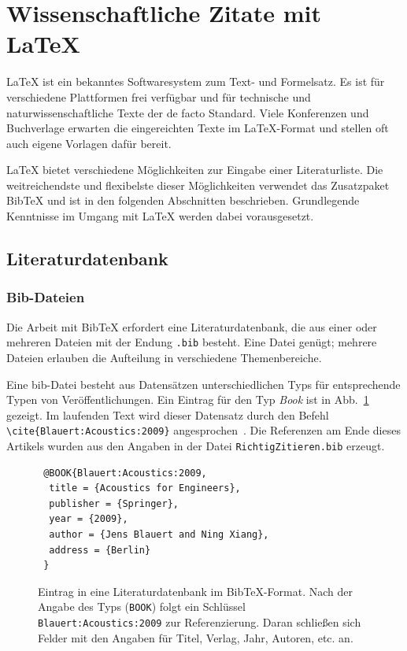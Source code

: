 \documentclass[a4paper, 10pt]{article}
\begin{document}
\section{Wissenschaftliche Zitate mit \LaTeX}
\label{sec:LaTeX}

\LaTeX{} ist ein bekanntes Softwaresystem zum Text- und Formelsatz. Es ist
f\"ur verschiedene Plattformen frei verf\"ugbar und f\"ur technische und
naturwissenschaftliche Texte der de facto Standard. Viele Konferenzen und
Buchverlage erwarten die eingereichten Texte im \LaTeX-Format und stellen oft
auch eigene Vorlagen daf\"ur bereit. 

\LaTeX{} bietet verschiedene M\"oglichkeiten zur Eingabe einer Literaturliste.
Die weitreichendste und flexibelste dieser M\"oglichkeiten verwendet das
Zusatzpaket BibTeX und ist in den folgenden Abschnitten beschrieben.
Grundlegende Kenntnisse im Umgang mit \LaTeX{} werden dabei vorausgesetzt. 

\subsection{Literaturdatenbank}

\subsubsection{Bib-Dateien}

Die Arbeit mit BibTeX erfordert eine Literaturdatenbank, die aus einer oder
mehreren Dateien mit der Endung {\tt .bib} besteht. Eine Datei gen\"ugt;
mehrere Dateien erlauben die Aufteilung in verschiedene Themenbereiche.

Eine bib-Datei besteht aus Datens\"atzen unterschiedlichen Typs f\"ur
entsprechende Typen von Ver\"offentlichungen. Ein Eintrag f\"ur den Typ
\emph{Book} ist in Abb.~\ref{fig:3} gezeigt. Im laufenden Text wird dieser
Datensatz durch den Befehl \verb+\cite{Blauert:Acoustics:2009}+
angesprochen~\cite{Blauert:Acoustics:2009}. Die Referenzen am Ende dieses
Artikels wurden aus den Angaben in der Datei {\tt RichtigZitieren.bib} erzeugt.

\begin{figure}[hbt]
\begin{verbatim}
 @BOOK{Blauert:Acoustics:2009,
  title = {Acoustics for Engineers},
  publisher = {Springer},
  year = {2009},
  author = {Jens Blauert and Ning Xiang},
  address = {Berlin}
 }
\end{verbatim}
\caption{Eintrag in eine Literaturdatenbank im BibTeX-Format. Nach der Angabe
des Typs ({\tt BOOK}) folgt ein Schl\"ussel {\tt Blauert:Acoustics:2009} zur
Referenzierung. Daran schlie{\ss}en sich Felder mit den Angaben f\"ur Titel,
Verlag, Jahr, Autoren, etc. an.}
\label{fig:3}
\end{figure}
\end{document}
